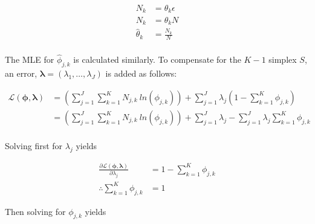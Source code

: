 \begin{equation}
      \label{eq:bhh:optimisation_step:mle:proof_log_likelihood_theta_part_4}
      \begin{split}
            N_{k} &= \theta_{k} \epsilon \\
            N_{k} &= \theta_{k} N \\
            \hat{\theta}_{k} &= \frac{N_{k}}{N}\\
      \end{split}
\end{equation}

The \acs{MLE} for $\hat{\phi}_{j, k} $ is calculated similarly. To compensate for the $K-1$ simplex $S$, an error, $\boldsymbol{\lambda} = (\lambda_{1}, \dots, \lambda_{J})$ is added as follows:

\begin{equation}
      \label{eq:bhh:optimisation_step:mle:proof_log_likelihood_phi_part_1}
      \begin{split}
            \mathcal{L}(\boldsymbol{\phi}, \boldsymbol{\lambda})
            &=  \left( \sum_{j=1}^{J} \sum_{k=1}^{K} N_{j,k} \ ln \left( \phi_{j,k} \right) \right) + \sum_{j=1}^{J} \lambda_{j} \left( 1 - \sum_{k=1}^{K} \phi_{j,k} \right) \\
            &=  \left( \sum_{j=1}^{J} \sum_{k=1}^{K} N_{j,k} \ ln \left( \phi_{j,k} \right) \right) + \sum_{j=1}^{J} \lambda_{j} - \sum_{j=1}^{J} \lambda_{j} \sum_{k=1}^{K} \phi_{j,k} \\
      \end{split}
\end{equation}

Solving first for $\lambda_{j}$ yields

\begin{equation}
      \label{eq:bhh:optimisation_step:mle:proof_log_likelihood_phi_part_2}
      \begin{split}
            \frac{\partial \mathcal{L}(\boldsymbol{\phi}, \boldsymbol{\lambda})}{\partial \lambda_{j}} &= 1 - \sum_{k=1}^{K} \phi_{j,k}  \\
            \therefore \sum_{k=1}^{K} \phi_{j,k}  &= 1
      \end{split}
\end{equation}

Then solving for $\phi_{j,k}$ yields

